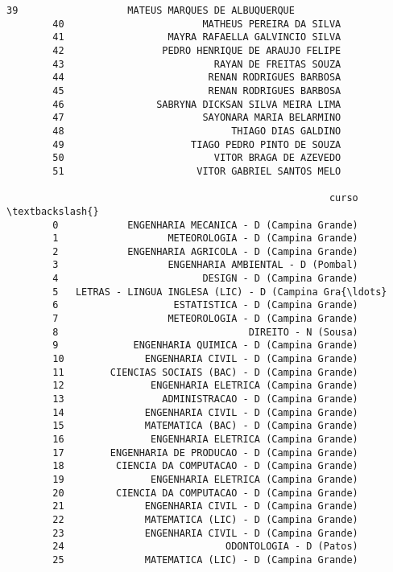 \documentclass[11pt]{article}
\begin{document}
\begin{Verbatim}[commandchars=\\\{\}]
        39                   MATEUS MARQUES DE ALBUQUERQUE   
        40                        MATHEUS PEREIRA DA SILVA   
        41                  MAYRA RAFAELLA GALVINCIO SILVA   
        42                 PEDRO HENRIQUE DE ARAUJO FELIPE   
        43                          RAYAN DE FREITAS SOUZA   
        44                         RENAN RODRIGUES BARBOSA   
        45                         RENAN RODRIGUES BARBOSA   
        46                SABRYNA DICKSAN SILVA MEIRA LIMA   
        47                        SAYONARA MARIA BELARMINO   
        48                             THIAGO DIAS GALDINO   
        49                      TIAGO PEDRO PINTO DE SOUZA   
        50                          VITOR BRAGA DE AZEVEDO   
        51                       VITOR GABRIEL SANTOS MELO   
        
                                                        curso  \textbackslash{}
        0            ENGENHARIA MECANICA - D (Campina Grande)   
        1                   METEOROLOGIA - D (Campina Grande)   
        2            ENGENHARIA AGRICOLA - D (Campina Grande)   
        3                   ENGENHARIA AMBIENTAL - D (Pombal)   
        4                         DESIGN - D (Campina Grande)   
        5   LETRAS - LINGUA INGLESA (LIC) - D (Campina Gra{\ldots}   
        6                    ESTATISTICA - D (Campina Grande)   
        7                   METEOROLOGIA - D (Campina Grande)   
        8                                 DIREITO - N (Sousa)   
        9             ENGENHARIA QUIMICA - D (Campina Grande)   
        10              ENGENHARIA CIVIL - D (Campina Grande)   
        11        CIENCIAS SOCIAIS (BAC) - D (Campina Grande)   
        12               ENGENHARIA ELETRICA (Campina Grande)   
        13                 ADMINISTRACAO - D (Campina Grande)   
        14              ENGENHARIA CIVIL - D (Campina Grande)   
        15              MATEMATICA (BAC) - D (Campina Grande)   
        16               ENGENHARIA ELETRICA (Campina Grande)   
        17        ENGENHARIA DE PRODUCAO - D (Campina Grande)   
        18         CIENCIA DA COMPUTACAO - D (Campina Grande)   
        19               ENGENHARIA ELETRICA (Campina Grande)   
        20         CIENCIA DA COMPUTACAO - D (Campina Grande)   
        21              ENGENHARIA CIVIL - D (Campina Grande)   
        22              MATEMATICA (LIC) - D (Campina Grande)   
        23              ENGENHARIA CIVIL - D (Campina Grande)   
        24                            ODONTOLOGIA - D (Patos)   
        25              MATEMATICA (LIC) - D (Campina Grande)   

\end{Verbatim}
\end{document}
